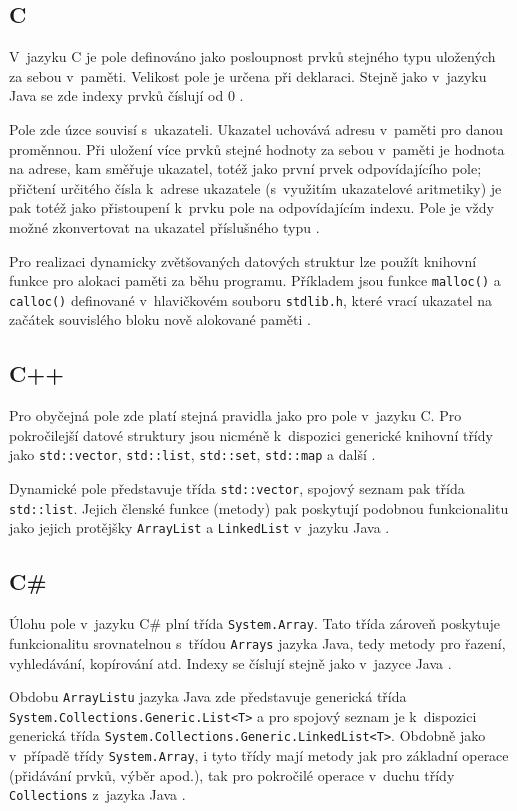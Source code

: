 \documentclass[czech,BP]{thesiskiv}
\begin{document}
\subsection{C}
V~jazyku C je pole definováno jako posloupnost prvků stejného typu uložených za sebou v~paměti. Velikost pole je určena při deklaraci. Stejně jako v~jazyku Java se zde indexy prvků číslují od 0 \cite{cpp-guide-array}.\par
Pole zde úzce souvisí s~ukazateli. Ukazatel uchovává adresu v~paměti pro danou proměnnou. Při uložení více prvků stejné hodnoty za sebou v~paměti je hodnota na adrese, kam směřuje ukazatel, totéž jako první prvek odpovídajícího pole; přičtení určitého čísla k~adrese ukazatele (s~využitím ukazatelové aritmetiky) je pak totéž jako přistoupení k~prvku pole na odpovídajícím indexu. Pole je vždy možné zkonvertovat na ukazatel příslušného typu \cite{cpp-guide-pointer}.\par
Pro realizaci dynamicky zvětšovaných datových struktur lze použít knihovní funkce pro alokaci paměti za běhu programu. Příkladem jsou funkce \texttt{malloc()} a \texttt{calloc()} definované v~hlavičkovém souboru \texttt{stdlib.h}, které vrací ukazatel na začátek souvislého bloku nově alokované paměti \cite{cpp-guide-malloc, cpp-guide-calloc}.

\subsection{C++}
Pro obyčejná pole zde platí stejná pravidla jako pro pole v~jazyku C. Pro pokročilejší datové struktury jsou nicméně k~dispozici generické knihovní třídy jako \texttt{std::vector}, \texttt{std::list}, \texttt{std::set}, \texttt{std::map} a další \cite{cpp-guide-vector, cpp-guide-list, cpp-guide-set, cpp-guide-map}.\par
Dynamické pole představuje třída \texttt{std::vector}, spojový seznam pak třída \texttt{std::list}. Jejich členské funkce (metody) pak poskytují podobnou funkcionalitu jako jejich protějšky \texttt{ArrayList} a \texttt{LinkedList} v~jazyku Java \cite{cpp-guide-vector, cpp-guide-list}.

\subsection{C\#}
Úlohu pole v~jazyku C\# plní třída \texttt{System.Array}. Tato třída zároveň poskytuje funkcionalitu srovnatelnou s~třídou \texttt{Arrays} jazyka Java, tedy metody pro řazení, vyhledávání, kopírování atd. Indexy se číslují stejně jako v~jazyce Java \cite{cs-guide-array-tutorial, cs-guide-array}.\par
Obdobu \texttt{ArrayListu} jazyka Java zde představuje generická třída \texttt{System\-.Collections.Generic.List<T>} a pro spojový seznam je k~dispozici generická třída \texttt{System.Collections.Generic.LinkedList<T>}. Obdobně jako v~případě třídy \texttt{System.Array}, i tyto třídy mají metody jak pro základní operace (přidávání prvků, výběr apod.), tak pro pokročilé operace v~duchu třídy \texttt{Collections} z~jazyka Java \cite{cs-guide-list, cs-guide-linkedlist}.
\end{document}
